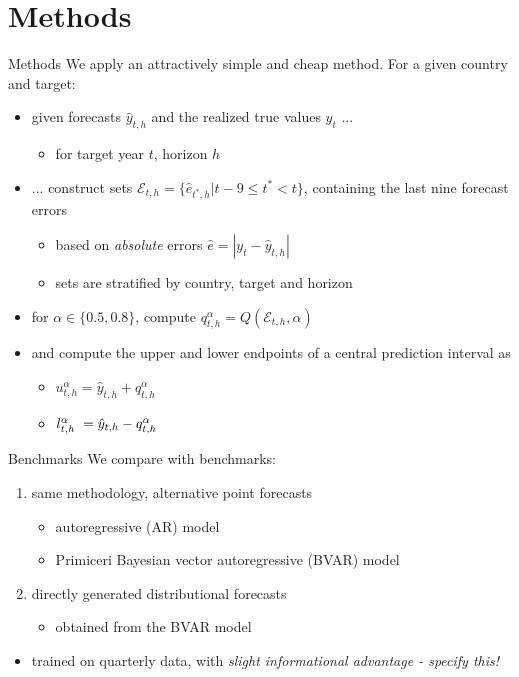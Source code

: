 \documentclass[en]{sdqbeamer}
\begin{document}
\section{Methods}
\begin{frame}{Methods}
We apply an attractively simple and cheap method. For a given country and target:
\begin{itemize}
    \item given forecasts $\hat{y}_{t, h}$ and the realized true values $y_{t}$ ...
    \begin{itemize}
        \item for target year $t$, horizon $h$
    \end{itemize}
    \item ... construct sets $\mathcal{E}_{t, h} = \{\hat{e}_{t^*, h}  | t-9 \leq t^* < t \}$, containing the last nine forecast errors
    \begin{itemize}
        \item based on \textit{absolute} errors $\hat{e} = |y_{t} - \hat{y}_{t, h}| $
        \item sets are stratified by country, target and horizon
    \end{itemize}
    \item for $\alpha \in \{0.5, 0.8\}$, compute $q^{\alpha}_{t, h} =  Q\left(\mathcal{E}_{t, h}, \alpha \right)$
    \item and compute the upper and lower endpoints of a central prediction interval as 
    \begin{itemize}
        \item $u^{\alpha}_{t,h} = \hat{y}_{t, h} + q^{\alpha}_{t, h}$ 
        \item $l^{\alpha}_{t,h} \hspace{1mm} = \hat{y}_{t, h} - q^{\alpha}_{t, h}$
    \end{itemize}
\end{itemize}
    
\end{frame}

\begin{frame}{Benchmarks}
    We compare with benchmarks:
\begin{enumerate}
    \item same methodology, alternative point forecasts
    \begin{itemize}
        \item autoregressive (AR) model
        \item Primiceri Bayesian vector autoregressive (BVAR) model
    \end{itemize}
    \item directly generated distributional forecasts
    \begin{itemize}
        \item obtained from the BVAR model
    \end{itemize}
\end{enumerate}
\begin{itemize}
    \item trained on quarterly data, with \textit{slight informational advantage - specify this!} 
\end{itemize}

\end{frame}
\end{document}
